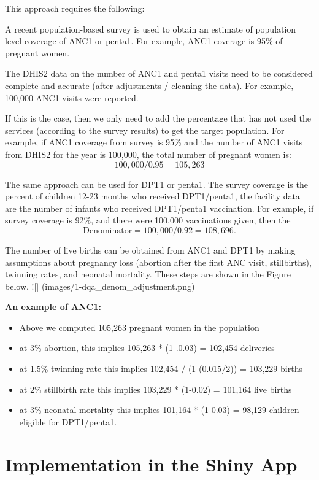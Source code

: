 \documentclass[
  english,
  letterpaper,
  DIV=11,
  numbers=noendperiod]{scrreprt}
\begin{document}
This approach requires the following:

A recent population-based survey is used to obtain an estimate of
population level coverage of ANC1 or penta1. For example, ANC1 coverage
is 95\% of pregnant women.

The DHIS2 data on the number of ANC1 and penta1 visits need to be
considered complete and accurate (after adjustments / cleaning the
data). For example, 100,000 ANC1 visits were reported.

If this is the case, then we only need to add the percentage that has
not used the services (according to the survey results) to get the
target population. For example, if ANC1 coverage from survey is 95\% and
the number of ANC1 visits from DHIS2 for the year is 100,000, the total
number of pregnant women is: \[ 100,000 / 0.95 = 105,263 \]

The same approach can be used for DPT1 or penta1. The survey coverage is
the percent of children 12-23 months who received DPT1/penta1, the
facility data are the number of infants who received DPT1/penta1
vaccination. For example, if survey coverage is 92\%, and there were
100,000 vaccinations given, then the
\[ \text{Denominator}= 100,000 / 0.92 = 108,696. \]

The number of live births can be obtained from ANC1 and DPT1 by making
assumptions about pregnancy loss (abortion after the first ANC visit,
stillbirths), twinning rates, and neonatal mortality. These steps are
shown in the Figure below. !{[}{]} (images/1-dqa\_denom\_adjustment.png)

\textbf{An example of ANC1:}

\begin{itemize}
\item
  Above we computed 105,263 pregnant women in the population
\item
  at 3\% abortion, this implies 105,263 * (1-.0.03) = 102,454 deliveries
\item
  at 1.5\% twinning rate this implies 102,454 / (1-(0.015/2)) = 103,229
  births
\item
  at 2\% stillbirth rate this implies 103,229 * (1-0.02) = 101,164 live
  births
\item
  at 3\% neonatal mortality this implies 101,164 * (1-0.03) = 98,129
  children eligible for DPT1/penta1.
\end{itemize}

\section{Implementation in the Shiny
App}\label{implementation-in-the-shiny-app}
\end{document}
